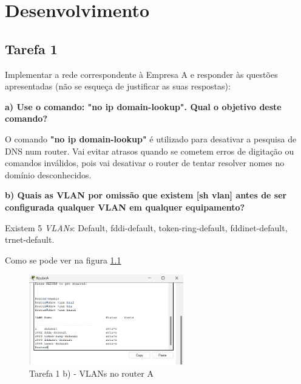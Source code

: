 \documentclass[11pt,english, openright, oneside]{book}
\begin{document}
\chapter{Desenvolvimento}

\section{Tarefa 1}
\vspace{0.2cm}

Implementar a rede correspondente à Empresa A e responder às questões
apresentadas (não se esqueça de justificar as suas respostas):  

\vspace{0.8cm}

\textbf{a) Use o comando: "no ip domain-lookup". Qual o objetivo deste comando?}
\vspace{0.2cm}

O comando \textbf{"no ip domain-lookup"} é utilizado para desativar a pesquisa
de DNS num router. Vai evitar atrasos quando se cometem erros de digitação ou
comandos inválidos, pois vai desativar o router de tentar resolver nomes no
domínio desconhecidos.
\vspace{0.8cm}


\textbf{b) Quais as VLAN por omissão que existem [sh vlan] antes de ser configurada qualquer VLAN em qualquer equipamento?}
\vspace{0.2cm}

Existem 5 \textit{VLANs}: Default, fddi-default, token-ring-default,
fddinet-default, trnet-default.

Como se pode ver na figura \ref{fig:1b}
\vspace{0.4cm}

\begin{figure}[htp]
    \centering
    \includegraphics[width=0.6\textwidth]{imagens/Tarefa1/1.b.png}
    \caption{Tarefa 1 b) - VLANs no router A}
    \label{fig:1b}
\end{figure}

\vspace{0.8cm}
\end{document}
